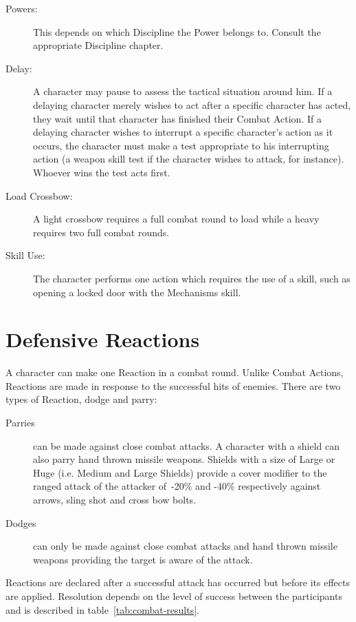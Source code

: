 \begin{description}
\item[Powers:] This depends on which Discipline the Power belongs to. Consult the appropriate Discipline chapter.
\item[Delay:] A character may pause to assess the tactical situation around him. If a delaying character merely wishes to act after a specific character has acted, they wait until that character has finished their Combat Action. If a delaying character wishes to interrupt a specific character’s action as it occurs, the character must make a test appropriate to his interrupting action (a weapon skill test if the character wishes to attack, for instance). Whoever wins the test acts first. 
\item[Load Crossbow:] A light crossbow requires a full combat round to load while a heavy requires two full combat rounds.
\item[Skill Use:] The character performs one action which requires the use of a skill, such as opening a locked door with the Mechanisms skill.
\end{description}


\section{Defensive Reactions}
\label{sec:defensive-reactions}
A character can make one Reaction in a combat round. Unlike Combat Actions, Reactions are made in response to the successful hits of enemies. There are two types of Reaction, dodge and parry:

\begin{description}
	\item[Parries] can be made against close combat attacks. A character with a shield can also parry hand thrown missile weapons. Shields with a size of Large or Huge (i.e. Medium and Large Shields) provide a cover modifier to the ranged attack of the attacker of -20\% and -40\% respectively against arrows, sling shot and cross bow bolts. 
	\item[Dodges] can only be made against close combat attacks and hand thrown missile weapons providing the target is aware of the attack.  
\end{description}

\noindent Reactions are declared after a successful attack has occurred but before its effects are applied. Resolution depends on the level of success between the participants and is described in table~\ref{tab:combat-results}.

